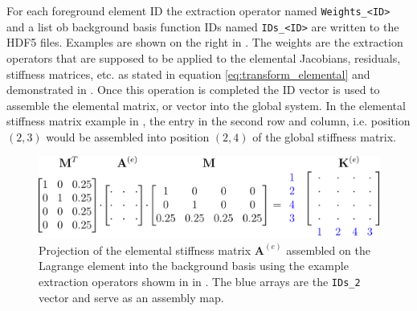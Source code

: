 For each foreground element ID the extraction operator named \texttt{Weights\_<ID>} and a list ob background basis function IDs named \texttt{IDs\_<ID>} are written to the HDF5 files. Examples are shown on the right in . The weights are the extraction operators that are supposed to be applied to the elemental Jacobians, residuals, stiffness matrices, etc. as stated in equation \eqref{eq:transform_elemental} and demonstrated in . Once this operation is completed the ID vector is used to assemble the elemental matrix, or vector into the global system. In the elemental stiffness matrix example in , the entry in the second row and column, i.e. position $(2,3)$ would be assembled into position $(2,4)$ of the global stiffness matrix.

\begin{figure}[h]
    \begin{center}
    \includegraphics[width=12cm]{Figures/assembly.png}
    \caption{Projection of the elemental stiffness matrix $\bm{A}^{(e)}$ assembled on the Lagrange element into the background basis using the example extraction operators showm in in . The blue arrays are the \texttt{IDs\_2} vector and serve as an assembly map.} 
    \label{fig:assembly}
    \end{center}
\end{figure}



